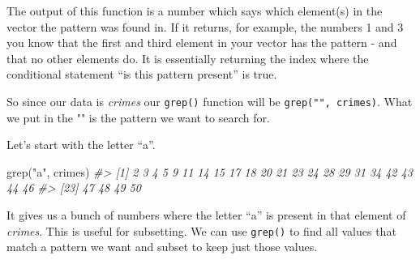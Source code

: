 \documentclass[
]{krantz}
\makeatletter
\newenvironment{Shaded}{\begin{snugshade}}{\end{snugshade}}
\newcommand{\CommentTok}[1]{\textcolor[rgb]{0.37,0.37,0.37}{\textit{#1}}}
\newcommand{\FunctionTok}[1]{\textcolor[rgb]{0,0,0}{#1}}
\newcommand{\NormalTok}[1]{#1}
\newcommand{\StringTok}[1]{\textcolor[rgb]{0.5,0.5,0.5}{#1}}
\newenvironment{kframe}{%
\medskip{}
\setlength{\fboxsep}{.8em}
 \def\at@end@of@kframe{}%
 \ifinner\ifhmode%
  \def\at@end@of@kframe{\end{minipage}}%
  \begin{minipage}{\columnwidth}%
 \fi\fi%
 \def\FrameCommand##1{\hskip\@totalleftmargin \hskip-\fboxsep
 \colorbox{shadecolor}{##1}\hskip-\fboxsep
     \hskip-\linewidth \hskip-\@totalleftmargin \hskip\columnwidth}%
 \MakeFramed {\advance\hsize-\width
   \@totalleftmargin\z@ \linewidth\hsize
   \@setminipage}}%
 {\par\unskip\endMakeFramed%
 \at@end@of@kframe}
\renewenvironment{Shaded}{\begin{kframe}}{\end{kframe}}
\makeatother
\begin{document}
The output of this function is a number which says which element(s) in the vector the pattern was found in. If it returns, for example, the numbers 1 and 3 you know that the first and third element in your vector has the pattern - and that no other elements do. It is essentially returning the index where the conditional statement ``is this pattern present'' is true.

So since our data is \emph{crimes} our \texttt{grep()} function will be \texttt{grep("",\ crimes)}. What we put in the "" is the pattern we want to search for.

Let's start with the letter ``a''.

\begin{Shaded}
\begin{Highlighting}[]
\FunctionTok{grep}\NormalTok{(}\StringTok{"a"}\NormalTok{, crimes)}
\CommentTok{\#\textgreater{}  [1]  2  3  4  5  9 11 14 15 17 18 20 21 23 24 28 29 31 34 42 43 44 46}
\CommentTok{\#\textgreater{} [23] 47 48 49 50}
\end{Highlighting}
\end{Shaded}

It gives us a bunch of numbers where the letter ``a'' is present in that element of \emph{crimes}. This is useful for subsetting. We can use \texttt{grep()} to find all values that match a pattern we want and subset to keep just those values.
\end{document}
